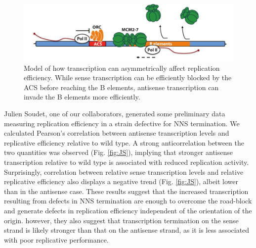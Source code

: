 \begin{figure}[h]

\centering
\includegraphics[width=\textwidth]{figures/results/model}
\caption[A model of how transcription can affect replication efficiency]{Model of how transcription can asymmetrically affect replication efficiency. While sense transcription can be efficiently blocked by the ACS before reaching the B elements, antisense transcription can invade the B elements more efficiently.}
\label{fig:model}

\end{figure} 

Julien Soudet, one of our collaborators, generated some preliminary data measuring replication efficiency in a strain defective for NNS termination. We calculated Pearson’s correlation between antisense transcription levels and replicative efficiency relative to wild type. A strong anticorrelation between the two quantities was observed (Fig. \ref{fig:JS}), implying that stronger antisense transcription relative to wild type is associated with reduced replication activity. Surprisingly, correlation between relative sense transcription levels and relative replicative efficiency also displays a negative trend (Fig.  \ref{fig:JS}), albeit lower than in the antisense case. These results suggest that the increased transcription resulting from defects in NNS termination are enough to overcome the road-block and generate defects in replication efficiency independent of the orientation of the origin. however, they also suggest that transcription termination on the sense strand is likely stronger than that on the antisense strand, as it is less associated with poor replicative performance. 

